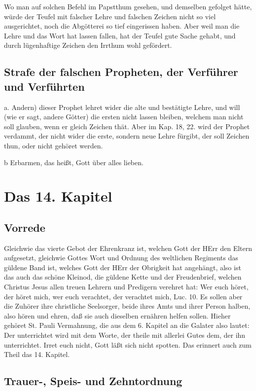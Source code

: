 Wo man auf solchen Befehl im Papstthum gesehen, und demselben gefolget hätte, würde der Teufel mit falscher Lehre und falschen Zeichen nicht so viel ausgerichtet, noch die Abgötterei so tief eingerissen haben. Aber weil man die Lehre und das Wort hat lassen fallen, hat der Teufel gute Sache gehabt, und durch lügenhaftige Zeichen den Irrthum wohl gefördert.

\section{Strafe der falschen Propheten, der Verführer und Verführten}

a. Andern) dieser Prophet lehret wider die alte und bestätigte Lehre, und will (wie er sagt, andere Götter) die ersten nicht lassen bleiben, welchem man nicht soll glauben, wenn er gleich Zeichen thät. Aber im Kap. 18, 22. wird der Prophet verdammt, der nicht wider die erste, sondern neue Lehre fürgibt, der soll Zeichen thun, oder nicht gehöret werden.

b Erbarmen, das heißt, Gott über alles lieben.

\chapter{Das 14. Kapitel}

\section{Vorrede}

Gleichwie das vierte Gebot der Ehrenkranz ist, welchen Gott der HErr den Eltern aufgesetzt, gleichwie Gottes Wort und Ordnung des weltlichen Regiments das güldene Band ist, welches Gott der HErr der Obrigkeit hat angehängt, also ist das auch das schöne Kleinod, die güldene Kette und der Freudenbrief, welchen Christus Jesus allen treuen Lehrern und Predigern verehret hat: Wer euch höret, der höret mich, wer euch verachtet, der verachtet mich, Luc. 10. Es sollen aber die Zuhörer ihre christliche Seelsorger, beide ihres Amts und ihrer Person halben, also hören und ehren, daß sie auch dieselben ernähren helfen sollen. Hieher gehöret St. Pauli Vermahnung, die aus dem 6. Kapitel an die Galater also lautet: Der unterrichtet wird mit dem Worte, der theile mit allerlei Gutes dem, der ihn unterrichtet. Irret euch nicht, Gott läßt sich nicht spotten. Das erinnert auch zum Theil das 14. Kapitel.

\section{Trauer-, Speis- und Zehntordnung}

